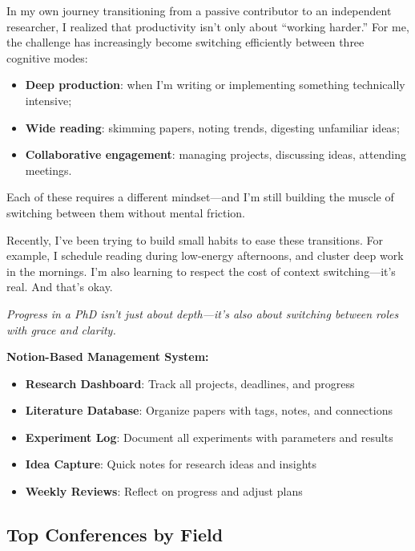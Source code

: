 \documentclass[11pt,a4paper]{article}
\begin{document}
\begin{tcolorbox}[colback=purple!5,colframe=royalpurple,title=Personal Reflection — Navigating Mode Switching in Research Life]
In my own journey transitioning from a passive contributor to an independent researcher, I realized that productivity isn't only about ``working harder.'' For me, the challenge has increasingly become switching efficiently between three cognitive modes:

\begin{itemize}
    \item \textbf{Deep production}: when I'm writing or implementing something technically intensive;
    \item \textbf{Wide reading}: skimming papers, noting trends, digesting unfamiliar ideas;
    \item \textbf{Collaborative engagement}: managing projects, discussing ideas, attending meetings.
\end{itemize}

Each of these requires a different mindset—and I'm still building the muscle of switching between them without mental friction.

Recently, I've been trying to build small habits to ease these transitions. For example, I schedule reading during low-energy afternoons, and cluster deep work in the mornings. I'm also learning to respect the cost of context switching—it's real. And that's okay.

\textit{Progress in a PhD isn't just about depth—it's also about switching between roles with grace and clarity.}
\end{tcolorbox}

\textbf{Notion-Based Management System:}
\begin{itemize}
    \item \textbf{Research Dashboard}: Track all projects, deadlines, and progress
    \item \textbf{Literature Database}: Organize papers with tags, notes, and connections
    \item \textbf{Experiment Log}: Document all experiments with parameters and results
    \item \textbf{Idea Capture}: Quick notes for research ideas and insights
    \item \textbf{Weekly Reviews}: Reflect on progress and adjust plans
\end{itemize}

\subsection{Top Conferences by Field}
\end{document}
